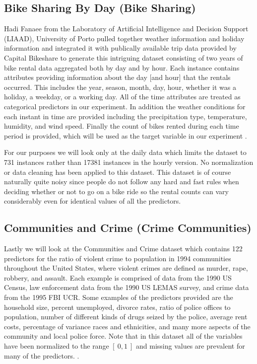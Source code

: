 \documentclass[9pt, conference]{IEEEtran}
\begin{document}
\subsection{Bike Sharing By Day (Bike Sharing)}
Hadi Fanaee from the Laboratory of Artificial Intelligence and Decision Support (LIAAD), University of Porto pulled together weather information and holiday information and integrated it with publically available trip data provided by Capital Bikeshare to generate this intriguing dataset consisting of two years of bike rental data aggregated both by day and by hour. Each instance contains attributes providing information about the day [and hour] that the rentals occurred. This includes the year, season, month, day, hour, whether it was a holiday, a weekday, or a working day. All of the time attributes are treated as categorical predictors in our experiment. In addition the weather conditions for each instant in time are provided including the precipitation type, temperature, humidity, and wind speed. Finally the count of bikes rented during each time period is provided, which will be used as the target variable in our experiment \cite{bikeSharingDataset} \cite{bikeSharingCiteRequest}. 

For our purposes we will look only at the daily data which limits the dataset to 731 instances rather than 17381 instances in the hourly version. No normalization or data cleaning has been applied to this dataset. This dataset is of course naturally quite noisy since people do not follow any hard and fast rules when deciding whether or not to go on a bike ride so the rental counts can vary considerably even for identical values of all the predictors.

\subsection{Communities and Crime (Crime Communities)}
Lastly we will look at the Communities and Crime dataset which contains 122 predictors for the ratio of violent crime to population in 1994 communities throughout the United States, where violent crimes are defined as murder, rape, robbery, and assault. Each example is comprised of data from the 1990 US Census, law enforcement data from the 1990 US LEMAS survey, and crime 
data from the 1995 FBI UCR. Some examples of the predictors provided are the household size, percent unemployed, divorce rates, ratio of police offices to population, number of different kinds of drugs seized by the police, average rent costs, percentage of variance races and ethnicities, and many more aspects of the community and local police force. Note that in this dataset all of the variables have been normalized to the range \([\ 0, 1\ ]\) and missing values are prevalent for many of the predictors. \cite{crimeCommunitiesDataset} \cite{crimeCommunitiesCiteRequest1} \cite{crimeCommunitiesCiteRequest2} \cite{crimeCommunitiesCiteRequest3} \cite{crimeCommunitiesCiteRequest4} \cite{crimeCommunitiesCiteRequest5}.
\end{document}
